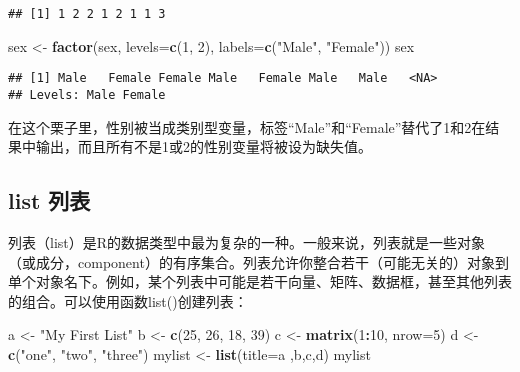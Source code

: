 \documentclass[]{book}
\newenvironment{Shaded}{\begin{snugshade}}{\end{snugshade}}
\newcommand{\DataTypeTok}[1]{\textcolor[rgb]{0.13,0.29,0.53}{#1}}
\newcommand{\DecValTok}[1]{\textcolor[rgb]{0.00,0.00,0.81}{#1}}
\newcommand{\KeywordTok}[1]{\textcolor[rgb]{0.13,0.29,0.53}{\textbf{#1}}}
\newcommand{\NormalTok}[1]{#1}
\newcommand{\OperatorTok}[1]{\textcolor[rgb]{0.81,0.36,0.00}{\textbf{#1}}}
\newcommand{\StringTok}[1]{\textcolor[rgb]{0.31,0.60,0.02}{#1}}
\begin{document}
\begin{verbatim}
## [1] 1 2 2 1 2 1 1 3
\end{verbatim}

\begin{Shaded}
\begin{Highlighting}[]
\NormalTok{sex <-}\StringTok{ }\KeywordTok{factor}\NormalTok{(sex, }\DataTypeTok{levels=}\KeywordTok{c}\NormalTok{(}\DecValTok{1}\NormalTok{, }\DecValTok{2}\NormalTok{), }\DataTypeTok{labels=}\KeywordTok{c}\NormalTok{(}\StringTok{"Male"}\NormalTok{, }\StringTok{"Female"}\NormalTok{))}
\NormalTok{sex}
\end{Highlighting}
\end{Shaded}

\begin{verbatim}
## [1] Male   Female Female Male   Female Male   Male   <NA>  
## Levels: Male Female
\end{verbatim}

在这个栗子里，性别被当成类别型变量，标签``Male''和``Female''替代了1和2在结果中输出，而且所有不是1或2的性别变量将被设为缺失值。

\hypertarget{list-}{%
\subsection{list 列表}\label{list-}}

列表（list）是R的数据类型中最为复杂的一种。一般来说，列表就是一些对象（或成分，component）的有序集合。列表允许你整合若干（可能无关的）对象到单个对象名下。例如，某个列表中可能是若干向量、矩阵、数据框，甚至其他列表的组合。可以使用函数list()创建列表：

\begin{Shaded}
\begin{Highlighting}[]
\NormalTok{a <-}\StringTok{ "My First List"}
\NormalTok{b <-}\StringTok{ }\KeywordTok{c}\NormalTok{(}\DecValTok{25}\NormalTok{, }\DecValTok{26}\NormalTok{, }\DecValTok{18}\NormalTok{, }\DecValTok{39}\NormalTok{)}
\NormalTok{c <-}\StringTok{ }\KeywordTok{matrix}\NormalTok{(}\DecValTok{1}\OperatorTok{:}\DecValTok{10}\NormalTok{, }\DataTypeTok{nrow=}\DecValTok{5}\NormalTok{)}
\NormalTok{d <-}\StringTok{ }\KeywordTok{c}\NormalTok{(}\StringTok{"one"}\NormalTok{, }\StringTok{"two"}\NormalTok{, }\StringTok{"three"}\NormalTok{)}
\NormalTok{mylist <-}\StringTok{ }\KeywordTok{list}\NormalTok{(}\DataTypeTok{title=}\NormalTok{a ,b,c,d)}
\NormalTok{mylist}
\end{Highlighting}
\end{Shaded}
\end{document}
